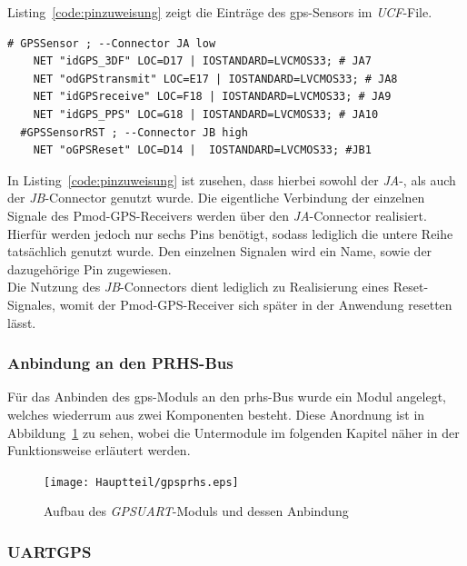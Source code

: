 Listing~\ref{code:pinzuweisung} zeigt die Einträge des \ac{gps}-Sensors im \emph{UCF}-File. \\

\lstset{language=VHDL}
\begin{lstlisting}[caption={Pmod-Port Pinzuweisung innerhalb des \emph{UCF}-Files},label={code:pinzuweisung}]
  # GPSSensor ; --Connector JA low
    NET "idGPS_3DF" LOC=D17 | IOSTANDARD=LVCMOS33; # JA7
    NET "odGPStransmit" LOC=E17 | IOSTANDARD=LVCMOS33; # JA8
    NET "idGPSreceive" LOC=F18 | IOSTANDARD=LVCMOS33; # JA9
    NET "idGPS_PPS" LOC=G18 | IOSTANDARD=LVCMOS33; # JA10
  #GPSSensorRST ; --Connector JB high
    NET "oGPSReset" LOC=D14 |  IOSTANDARD=LVCMOS33; #JB1
\end{lstlisting}

In Listing~\ref{code:pinzuweisung} ist zusehen, dass hierbei sowohl der \emph{JA}-, als auch der \emph{JB}-Connector
genutzt wurde. Die eigentliche Verbindung der einzelnen Signale des Pmod-GPS-Receivers werden über den
\emph{JA}-Connector realisiert. Hierfür werden jedoch nur sechs Pins benötigt, sodass lediglich die untere
Reihe tatsächlich genutzt wurde. Den einzelnen Signalen wird ein Name, sowie der dazugehörige Pin
zugewiesen.\\
Die Nutzung des \emph{JB}-Connectors dient lediglich zu Realisierung eines Reset-Signales, womit der
Pmod-GPS-Receiver sich später in der Anwendung resetten lässt. \\

\subsubsection{Anbindung an den PRHS-Bus}\label{kap:prhsbus}

Für das Anbinden des \ac{gps}-Moduls an den \ac{prhs}-Bus wurde ein Modul angelegt, welches wiederrum aus
zwei Komponenten besteht. Diese Anordnung ist in Abbildung~\ref{fig:gpsprhs} zu sehen, wobei die Untermodule im
folgenden Kapitel näher in der Funktionsweise erläutert werden.\\

\begin{figure}[h!]
\centering
\texttt{[image: Hauptteil/gpsprhs.eps]}
\caption{Aufbau des \emph{GPSUART}-Moduls und dessen Anbindung}
\label{fig:gpsprhs}
\end{figure}

\subsubsection{UARTGPS}\label{kap:uartgps}

